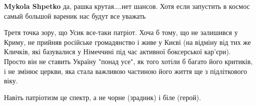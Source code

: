 \begin{itemize}
\begin{itemize}
\textbf{Mykola Shpetko} да, рашка крутая....нет шансов. Хотя если запустить в космос самый большой вареник нас будут все уважать
\end{itemize} %


Третя точка зору, що Усик все-таки патріот. Хоча б тому, що не залишився у
Криму, не прийняв російське громадянство і живе у Києві (на відміну від тих же
Кличків, які базувалися у Німеччині під час активної боксерської кар'єри).
Просто він не ставить Україну "понад усе", як того хотіли б багато його
критиків, і не змінює церкви, яка стала важливою частиною його життя ще з
підліткового віку.

Навіть патріотизм це спектр, а не чорне (зрадник) і біле (герой).




\end{itemize} %

